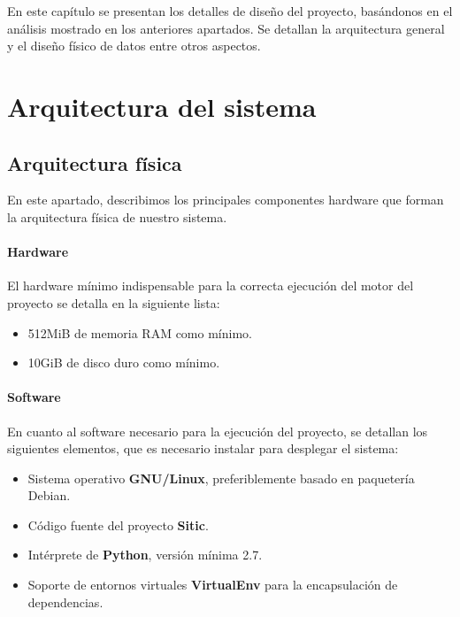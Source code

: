 
En este capítulo se presentan los detalles de diseño del proyecto, basándonos en el
análisis mostrado en los anteriores apartados. Se detallan la arquitectura general
y el diseño físico de datos entre otros aspectos.


\section{Arquitectura del sistema}

\subsection{Arquitectura física}

En este apartado, describimos los principales componentes hardware que forman
la arquitectura física de nuestro sistema.

\paragraph{Hardware}
El hardware mínimo indispensable para la correcta ejecución del motor del
proyecto se detalla en la siguiente lista:

\begin{itemize}
    \item 512MiB de memoria RAM como mínimo.
    \item 10GiB de disco duro como mínimo.
\end{itemize}

\paragraph{Software}

En cuanto al software necesario para la ejecución del proyecto, se detallan los
siguientes elementos, que es necesario instalar para desplegar el sistema:

\begin{itemize}
    \item Sistema operativo \textbf{GNU/Linux}, preferiblemente basado en paquetería Debian.
    \item Código fuente del proyecto \textbf{Sitic}.
    \item Intérprete de \textbf{Python}, versión mínima 2.7.
    \item Soporte de entornos virtuales \textbf{VirtualEnv} para la encapsulación de dependencias.
\end{itemize}

